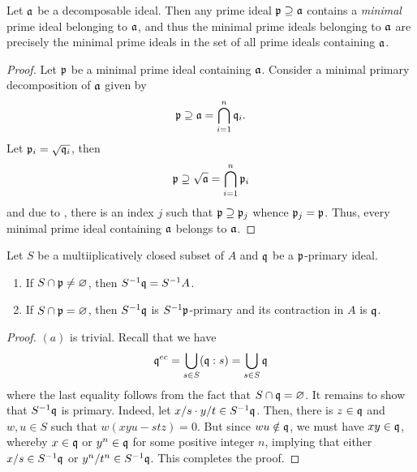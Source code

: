 \begin{proposition}
    Let $\mathfrak a$ be a decomposable ideal. Then any prime ideal $\mathfrak p\supseteq\mathfrak a$ contains a \textit{minimal} prime ideal belonging to $\mathfrak a$, and thus the minimal prime ideals belonging to $\mathfrak a$ are precisely the minimal prime ideals in the set of all prime ideals containing $\mathfrak a$.
\end{proposition}
\begin{proof}
    Let $\mathfrak p$ be a minimal prime ideal containing $\mathfrak a$. Consider a minimal primary decomposition of $\mathfrak a$ given by 
    \begin{equation*}
        \mathfrak p\supseteq\mathfrak a = \bigcap_{i = 1}^n\mathfrak q_i.
    \end{equation*}
    Let $\mathfrak p_i = \sqrt{\mathfrak q_i}$, then 
    \begin{equation*}
        \mathfrak p\supseteq\sqrt{\mathfrak a} = \bigcap_{i = 1}^n\mathfrak p_i
    \end{equation*}
    and due to , there is an index $j$ such that $\mathfrak p\supseteq\mathfrak p_j$ whence $\mathfrak p_j = \mathfrak p$. Thus, every minimal prime ideal containing $\mathfrak a$ belongs to $\mathfrak a$.
\end{proof}

\begin{proposition}
    Let $S$ be a multiiplicatively closed subset of $A$ and $\mathfrak q$ be a $\mathfrak p$-primary ideal. 
    \begin{enumerate}[label=(\alph*)]
        \item If $S\cap\mathfrak p\ne\varnothing$, then $S^{-1}\mathfrak q = S^{-1}A$. 
        \item If $S\cap\mathfrak p = \varnothing$, then $S^{-1}\mathfrak q$ is $S^{-1}\mathfrak p$-primary and its contraction in $A$ is $\mathfrak q$.
    \end{enumerate}
\end{proposition}
\begin{proof}
    $(a)$ is trivial. Recall that we have 
    \begin{equation*}
        \mathfrak q^{ec} = \bigcup_{s\in S}(\mathfrak q: s) = \bigcup_{s\in S}\mathfrak q
    \end{equation*}
    where the last equality follows from the fact that $S\cap\mathfrak q = \varnothing$. It remains to show that $S^{-1}\mathfrak q$ is primary. Indeed, let $x/s\cdot y/t\in S^{-1}\mathfrak q$. Then, there is $z\in\mathfrak q$ and $w,u\in S$ such that $w(xyu - stz) = 0$. But since $wu\notin\mathfrak q$, we must have $xy\in\mathfrak q$, whereby $x\in\mathfrak q$ or $y^n\in\mathfrak q$ for some positive integer $n$, implying that either $x/s\in S^{-1}\mathfrak q$ or $y^n/t^n\in S^{-1}\mathfrak q$. This completes the proof.
\end{proof}

